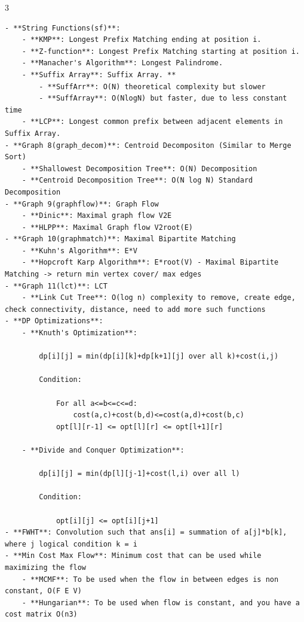 \documentclass[10pt,landscape, a4paper]{article}
\begin{document}
\begin{multicols*}{3}
\begin{lstlisting}[]
- **String Functions(sf)**:
    - **KMP**: Longest Prefix Matching ending at position i.
    - **Z-function**: Longest Prefix Matching starting at position i.
    - **Manacher's Algorithm**: Longest Palindrome.
    - **Suffix Array**: Suffix Array. **
        - **SuffArr**: O(N) theoretical complexity but slower
        - **SuffArray**: O(NlogN) but faster, due to less constant time
    - **LCP**: Longest common prefix between adjacent elements in Suffix Array.
- **Graph 8(graph_decom)**: Centroid Decompositon (Similar to Merge Sort)
    - **Shallowest Decomposition Tree**: O(N) Decomposition
    - **Centroid Decomposition Tree**: O(N log N) Standard Decomposition
- **Graph 9(graphflow)**: Graph Flow
    - **Dinic**: Maximal graph flow V2E
    - **HLPP**: Maximal Graph flow V2root(E)
- **Graph 10(graphmatch)**: Maximal Bipartite Matching
    - **Kuhn's Algorithm**: E*V
    - **Hopcroft Karp Algorithm**: E*root(V) - Maximal Bipartite Matching -> return min vertex cover/ max edges
- **Graph 11(lct)**: LCT
    - **Link Cut Tree**: O(log n) complexity to remove, create edge, check connectivity, distance, need to add more such functions
- **DP Optimizations**:
    - **Knuth's Optimization**: 
    
        dp[i][j] = min(dp[i][k]+dp[k+1][j] over all k)+cost(i,j)
    
        Condition: 
            
            For all a<=b<=c<=d:
                cost(a,c)+cost(b,d)<=cost(a,d)+cost(b,c)
            opt[l][r-1] <= opt[l][r] <= opt[l+1][r]
    
    - **Divide and Conquer Optimization**:
        
        dp[i][j] = min(dp[l][j-1]+cost(l,i) over all l)
        
        Condition:
        
            opt[i][j] <= opt[i][j+1]
- **FWHT**: Convolution such that ans[i] = summation of a[j]*b[k], where j logical condition k = i
- **Min Cost Max Flow**: Minimum cost that can be used while maximizing the flow
    - **MCMF**: To be used when the flow in between edges is non constant, O(F E V)
    - **Hungarian**: To be used when flow is constant, and you have a cost matrix O(n3)
\end{lstlisting}

\scriptsize
\end{multicols*}
\end{document}
